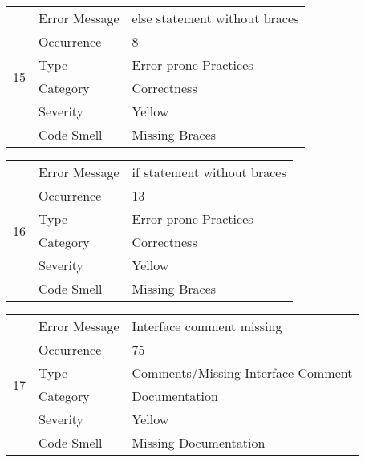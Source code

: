 \documentclass[12pt,english]{article}
\begin{document}
\begin{table}[!ht]
    \begin{tabularx}{\textwidth}{|c|l|X|}
    \hline
        \multirow{6}{*}{15} & Error Message & else statement without braces \\ \cline{2-3}
        & Occurrence & 8 \\ \cline{2-3}
        & Type & Error-prone Practices \\ \cline{2-3}
        & Category & Correctness \\ \cline{2-3}
        & Severity & Yellow \\ \cline{2-3}
        & Code Smell & Missing Braces \\ \hline
    \end{tabularx}
\end{table}


\begin{table}[!ht]
    \begin{tabularx}{\textwidth}{|c|l|X|}
    \hline
        \multirow{6}{*}{16} & Error Message & if statement without braces \\ \cline{2-3}
        & Occurrence & 13 \\ \cline{2-3}
        & Type & Error-prone Practices \\ \cline{2-3}
        & Category & Correctness \\ \cline{2-3}
        & Severity & Yellow \\ \cline{2-3}
        & Code Smell & Missing Braces \\ \hline
    \end{tabularx}
\end{table}

\begin{table}[!ht]
    \begin{tabularx}{\textwidth}{|c|l|X|}
    \hline
        \multirow{6}{*}{17} & Error Message & Interface comment missing \\ \cline{2-3}
        & Occurrence & 75 \\ \cline{2-3}
        & Type & Comments/Missing Interface Comment \\ \cline{2-3}
        & Category & Documentation \\ \cline{2-3}
        & Severity & Yellow \\ \cline{2-3}
        & Code Smell & Missing Documentation \\ \hline
    \end{tabularx}
\end{table}
\end{document}
